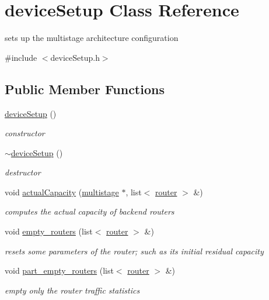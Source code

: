 \hypertarget{classdeviceSetup}{
\section{deviceSetup Class Reference}
\label{classdeviceSetup}
}


sets up the multistage architecture configuration  




{\ttfamily \#include $<$deviceSetup.h$>$}

\subsection*{Public Member Functions}
\begin{DoxyCompactItemize}
\item 
\hyperlink{classdeviceSetup_aee6d5a2f08053ef7071853eaefd4ca42}{deviceSetup} ()
\begin{DoxyCompactList}\small\item\em constructor \item\end{DoxyCompactList}\item 
\hyperlink{classdeviceSetup_a80a771874b29d08f05f92c1b2c52c348}{$\sim$deviceSetup} ()
\begin{DoxyCompactList}\small\item\em destructor \item\end{DoxyCompactList}\item 
void \hyperlink{classdeviceSetup_a56a51cc81222dec1a08e1d07eafca000}{actualCapacity} (\hyperlink{classmultistage}{multistage} $\ast$, list$<$ \hyperlink{classrouter}{router} $>$ \&)
\begin{DoxyCompactList}\small\item\em computes the actual capacity of backend routers \item\end{DoxyCompactList}\item 
void \hyperlink{classdeviceSetup_a89cb8151a7b9153ea09fcfc52260bb9b}{empty\_\-routers} (list$<$ \hyperlink{classrouter}{router} $>$ \&)
\begin{DoxyCompactList}\small\item\em resets some parameters of the router; such as its initial residual capacity \item\end{DoxyCompactList}\item 
void \hyperlink{classdeviceSetup_a5570f97a50fe149a89b9f62500932cec}{part\_\-empty\_\-routers} (list$<$ \hyperlink{classrouter}{router} $>$ \&)
\begin{DoxyCompactList}\small\item\em empty only the router traffic statistics \item\end{DoxyCompactList}\end{DoxyCompactItemize}


